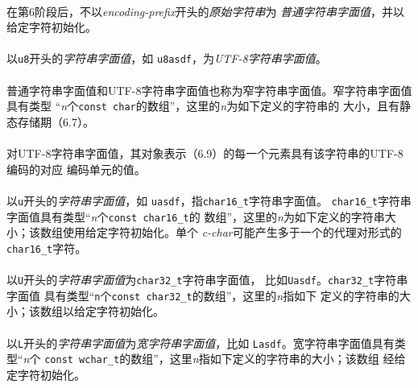 \paragraph{}
在第6阶段后，不以\textit{encoding-prefix}开头的\textit{原始字符串}为
\textit{普通字符串字面值}，并以给定字符初始化。

\paragraph{}
以\texttt{u8}开头的\textit{字符串字面值}，如
\texttt{u8\dq{}asdf\dq}，为\textit{UTF-8字符串字面值}。

\paragraph{}
普通字符串字面值和UTF-8字符串字面值也称为窄字符串字面值。窄字符串字面值具有类型
``\textit{n}个\texttt{const char}的数组''，这里的\textit{n}为如下定义的字符串的
大小，且有静态存储期（6.7）。

\paragraph{}
对UTF-8字符串字面值，其对象表示（6.9）的每一个元素具有该字符串的UTF-8编码的对应
编码单元的值。

\paragraph{}
以\texttt{u}开头的\textit{字符串字面值}，如
\texttt{u\dq{}asdf\dq}，指\texttt{char16\_t}字符串字面值。
\texttt{char16\_t}字符串字面值具有类型``\textit{n}个\texttt{const char16\_t}的
数组''，这里的\textit{n}为如下定义的字符串大小；该数组使用给定字符初始化。单个
\textit{c-char}可能产生多于一个的代理对形式的\texttt{char16\_t}字符。

\paragraph{}
以\texttt{U}开头的\textit{字符串字面值}为\texttt{char32\_t}字符串字面值，
比如\texttt{U\dq{}asdf\dq}。\texttt{char32\_t}字符串字面值
具有类型``\texttt{n}个\texttt{const char32\_t}的数组''，这里的\textit{n}指如下
定义的字符串的大小；该数组以给定字符初始化。

\paragraph{}
以\texttt{L}开头的\textit{字符串字面值}为\textit{宽字符串字面值}，比如
\texttt{L\dq{}asdf\dq}。宽字符串字面值具有类型``\textit{n}个
\texttt{const wchar\_t}的数组''，这里\textit{n}指如下定义的字符串的大小；该数组
经给定字符初始化。

